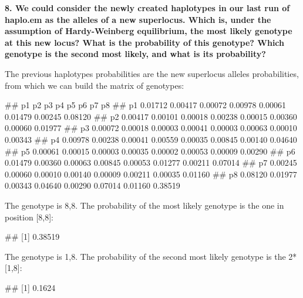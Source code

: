 \documentclass[]{article}
\newenvironment{Shaded}{\begin{snugshade}}{\end{snugshade}}
\newcommand{\NormalTok}[1]{#1}
\begin{document}
\textbf{8. We could consider the newly created haplotypes in our last
run of haplo.em as the alleles of a new superlocus. Which is, under the
assumption of Hardy-Weinberg equilibrium, the most likely genotype at
this new locus? What is the probability of this genotype? Which genotype
is the second most likely, and what is its probability?}

The previous haplotypes probabilities are the new superlocus alleles
probabilities, from which we can build the matrix of genotypes:

\begin{Shaded}
\begin{Highlighting}[]
\NormalTok{##    p1      p2      p3      p4      p5      p6      p7      p8}
\NormalTok{## p1 0.01712 0.00417 0.00072 0.00978 0.00061 0.01479 0.00245 0.08120}
\NormalTok{## p2 0.00417 0.00101 0.00018 0.00238 0.00015 0.00360 0.00060 0.01977}
\NormalTok{## p3 0.00072 0.00018 0.00003 0.00041 0.00003 0.00063 0.00010 0.00343}
\NormalTok{## p4 0.00978 0.00238 0.00041 0.00559 0.00035 0.00845 0.00140 0.04640}
\NormalTok{## p5 0.00061 0.00015 0.00003 0.00035 0.00002 0.00053 0.00009 0.00290}
\NormalTok{## p6 0.01479 0.00360 0.00063 0.00845 0.00053 0.01277 0.00211 0.07014}
\NormalTok{## p7 0.00245 0.00060 0.00010 0.00140 0.00009 0.00211 0.00035 0.01160}
\NormalTok{## p8 0.08120 0.01977 0.00343 0.04640 0.00290 0.07014 0.01160 0.38519}
\end{Highlighting}
\end{Shaded}

The genotype is 8,8. The probability of the most likely genotype is the
one in position {[}8,8{]}:

\begin{Shaded}
\begin{Highlighting}[]
\NormalTok{## [1] 0.38519}
\end{Highlighting}
\end{Shaded}

The genotype is 1,8. The probability of the second most likely genotype
is the 2*{[}1,8{]}:

\begin{Shaded}
\begin{Highlighting}[]
\NormalTok{## [1] 0.1624}
\end{Highlighting}
\end{Shaded}
\end{document}
